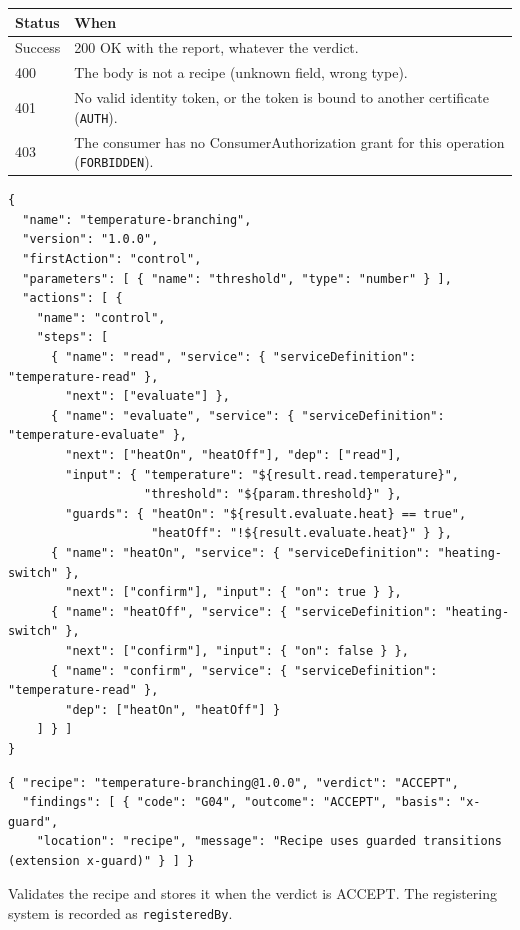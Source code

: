 \documentclass[a4paper]{arrowhead}
\begin{document}
{\small
\begin{longtable}{|p{2.0cm}|p{13.8cm}|}

\hline
\rowcolor{gray!33} Status & When \\ \hline
\endhead
Success & 200 OK with the report, whatever the verdict. \\ \hline
400 & The body is not a recipe (unknown field, wrong type). \\ \hline
401 & No valid identity token, or the token is bound to another certificate (\texttt{AUTH}). \\ \hline
403 & The consumer has no ConsumerAuthorization grant for this operation (\texttt{FORBIDDEN}). \\ \hline
\end{longtable}
}


\begin{lstlisting}[caption={Example request body}]
{
  "name": "temperature-branching",
  "version": "1.0.0",
  "firstAction": "control",
  "parameters": [ { "name": "threshold", "type": "number" } ],
  "actions": [ {
    "name": "control",
    "steps": [
      { "name": "read", "service": { "serviceDefinition": "temperature-read" },
        "next": ["evaluate"] },
      { "name": "evaluate", "service": { "serviceDefinition": "temperature-evaluate" },
        "next": ["heatOn", "heatOff"], "dep": ["read"],
        "input": { "temperature": "${result.read.temperature}",
                   "threshold": "${param.threshold}" },
        "guards": { "heatOn": "${result.evaluate.heat} == true",
                    "heatOff": "!${result.evaluate.heat}" } },
      { "name": "heatOn", "service": { "serviceDefinition": "heating-switch" },
        "next": ["confirm"], "input": { "on": true } },
      { "name": "heatOff", "service": { "serviceDefinition": "heating-switch" },
        "next": ["confirm"], "input": { "on": false } },
      { "name": "confirm", "service": { "serviceDefinition": "temperature-read" },
        "dep": ["heatOn", "heatOff"] }
    ] } ]
}
\end{lstlisting}


\begin{lstlisting}[caption={Example response body}]
{ "recipe": "temperature-branching@1.0.0", "verdict": "ACCEPT",
  "findings": [ { "code": "G04", "outcome": "ACCEPT", "basis": "x-guard",
    "location": "recipe", "message": "Recipe uses guarded transitions (extension x-guard)" } ] }
\end{lstlisting}

Validates the recipe and stores it when the verdict is ACCEPT. The registering system is recorded as \texttt{registeredBy}.
\end{document}
